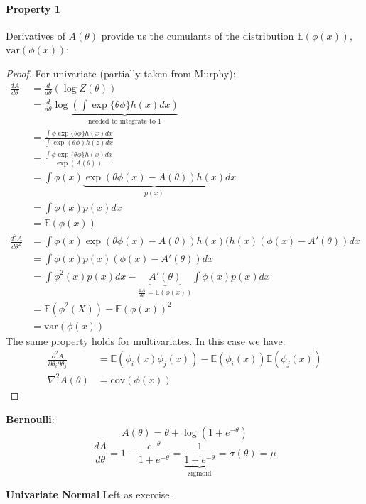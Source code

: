 \documentclass{article}
\begin{document}
\paragraph{Property 1} Derivatives of $A(\theta)$ provide us the cumulants of the distribution $\mathbb{E}(\phi(x))$, $\text{var}(\phi(x))$:
\begin{proof}
For univariate (partially taken from Murphy):
\begin{align*}
\frac{d A}{d \theta} &= \frac{d}{d\theta}(\log Z(\theta)) \\
&= \frac{d}{d \theta} \log \underbrace{\left(\int \exp\{\theta \phi\} h(x) dx\right)}_{\text{needed to integrate to $1$}} \\
&= \frac{\int\phi \exp\{\theta\phi\}h(x) dx}{\int \exp( \theta \phi) h(z) dx}\\
&= \frac{\int\phi \exp\{\theta\phi\}h(x) dx}{\exp(A(\theta))} \\
&= \int \phi(x) \underbrace{\exp(\theta \phi(x) - A(\theta)) h(x)}_{p(x)} dx\\
&= \int \phi(x) p(x) dx \\
&= \mathbb{E}(\phi(x))\\
\frac{d^2A}{d\theta^2} &= \int \phi(x)\exp(\theta\phi(x) - A(\theta))h(x)(h(x)(\phi(x) - A'(\theta))dx \\
&= \int \phi(x)p(x)(\phi(x) - A'(\theta))dx\\
&= \int \phi^2(x)p(x)dx - \underbrace{A'(\theta)}_{\frac{dA}{d\theta}=\mathbb{E}(\phi(x))} \int \phi(x)p(x)dx \\
&= \mathbb{E}(\phi^2(X)) - \mathbb{E}(\phi(x))^2 \\
&= \text{var}(\phi(x))
\end{align*}
The same property holds for multivariates. In this case we have:
\begin{align*}
\frac{\partial^2A}{\partial \theta_i \partial\theta_j} &= \mathbb{E}(\phi_i(x)\phi_j(x)) - \mathbb{E}(\phi_i(x))\mathbb{E}(\phi_j(x))\\
\nabla^2 A(\theta) &= \text{cov}(\phi(x))
\end{align*}

\end{proof}

\textbf{Bernoulli}: 
\[A(\theta) = \theta + \log(1 + e^{-\theta})\]
\[\frac{d A}{d\theta} = 1 - \frac{e^{-\theta}}{1 + e^{-\theta}} = \underbrace{\frac{1}{1 + e^{-\theta}}}_{\text{sigmoid}} = \sigma(\theta) = \mu \]

\textbf{Univariate Normal} Left as exercise.
\end{document}
